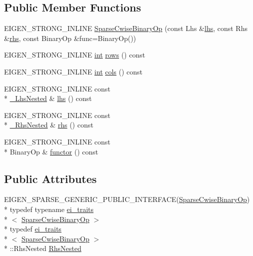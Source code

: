 \subsection*{Public Member Functions}
\begin{DoxyCompactItemize}
\item 
E\-I\-G\-E\-N\-\_\-\-S\-T\-R\-O\-N\-G\-\_\-\-I\-N\-L\-I\-N\-E \hyperlink{class_sparse_cwise_binary_op_a11ff6b9ee6826f1c64bc656f462743ed}{Sparse\-Cwise\-Binary\-Op} (const Lhs \&\hyperlink{class_sparse_cwise_binary_op_ad82158e23a7dd8126dbb116410379007}{lhs}, const Rhs \&\hyperlink{class_sparse_cwise_binary_op_a0243c4ebbf2d9aad0491a40944523a27}{rhs}, const Binary\-Op \&func=Binary\-Op())
\item 
E\-I\-G\-E\-N\-\_\-\-S\-T\-R\-O\-N\-G\-\_\-\-I\-N\-L\-I\-N\-E \hyperlink{ioapi_8h_a787fa3cf048117ba7123753c1e74fcd6}{int} \hyperlink{class_sparse_cwise_binary_op_a11025dee466d57ff34e45637da7c0060}{rows} () const 
\item 
E\-I\-G\-E\-N\-\_\-\-S\-T\-R\-O\-N\-G\-\_\-\-I\-N\-L\-I\-N\-E \hyperlink{ioapi_8h_a787fa3cf048117ba7123753c1e74fcd6}{int} \hyperlink{class_sparse_cwise_binary_op_af8c595c868da8ef7def4151dac379b6f}{cols} () const 
\item 
E\-I\-G\-E\-N\-\_\-\-S\-T\-R\-O\-N\-G\-\_\-\-I\-N\-L\-I\-N\-E const \\*
\hyperlink{class_sparse_cwise_binary_op_a33b189ff88f95c7bfe920b8e9b0d42c6}{\-\_\-\-Lhs\-Nested} \& \hyperlink{class_sparse_cwise_binary_op_ad82158e23a7dd8126dbb116410379007}{lhs} () const 
\item 
E\-I\-G\-E\-N\-\_\-\-S\-T\-R\-O\-N\-G\-\_\-\-I\-N\-L\-I\-N\-E const \\*
\hyperlink{class_sparse_cwise_binary_op_a33c5e3664f2a45c70c0821cfb875f20b}{\-\_\-\-Rhs\-Nested} \& \hyperlink{class_sparse_cwise_binary_op_a0243c4ebbf2d9aad0491a40944523a27}{rhs} () const 
\item 
E\-I\-G\-E\-N\-\_\-\-S\-T\-R\-O\-N\-G\-\_\-\-I\-N\-L\-I\-N\-E const \\*
Binary\-Op \& \hyperlink{class_sparse_cwise_binary_op_a105380ddea91f7a492668fad9cf8b0e8}{functor} () const 
\end{DoxyCompactItemize}
\subsection*{Public Attributes}
\begin{DoxyCompactItemize}
\item 
E\-I\-G\-E\-N\-\_\-\-S\-P\-A\-R\-S\-E\-\_\-\-G\-E\-N\-E\-R\-I\-C\-\_\-\-P\-U\-B\-L\-I\-C\-\_\-\-I\-N\-T\-E\-R\-F\-A\-C\-E(\hyperlink{class_sparse_cwise_binary_op}{Sparse\-Cwise\-Binary\-Op}) \\*
typedef typename \hyperlink{structei__traits}{ei\-\_\-traits}\\*
$<$ \hyperlink{class_sparse_cwise_binary_op}{Sparse\-Cwise\-Binary\-Op} $>$\\*
 typedef \hyperlink{structei__traits}{ei\-\_\-traits}\\*
$<$ \hyperlink{class_sparse_cwise_binary_op}{Sparse\-Cwise\-Binary\-Op} $>$\\*
\-::Rhs\-Nested \hyperlink{class_sparse_cwise_binary_op_ad4e1071aee8d4d88215fe279cf510d84}{Rhs\-Nested}
\end{DoxyCompactItemize}
